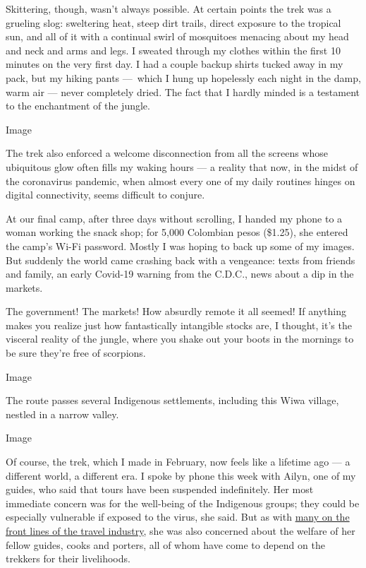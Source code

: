 Skittering, though, wasn't always possible. At certain points the trek
was a grueling slog: sweltering heat, steep dirt trails, direct exposure
to the tropical sun, and all of it with a continual swirl of mosquitoes
menacing about my head and neck and arms and legs. I sweated through my
clothes within the first 10 minutes on the very first day. I had a
couple backup shirts tucked away in my pack, but my hiking pants
---~which I hung up hopelessly each night in the damp, warm air ---
never completely dried. The fact that I hardly minded is a testament to
the enchantment of the jungle.

Image

The trek also enforced a welcome disconnection from all the screens
whose ubiquitous glow often fills my waking hours --- a reality that
now, in the midst of the coronavirus pandemic, when almost every one of
my daily routines hinges on digital connectivity, seems difficult to
conjure.

At our final camp, after three days without scrolling, I handed my phone
to a woman working the snack shop; for 5,000 Colombian pesos (\$1.25),
she entered the camp's Wi-Fi password. Mostly I was hoping to back up
some of my images. But suddenly the world came crashing back with a
vengeance: texts from friends and family, an early Covid-19 warning from
the C.D.C., news about a dip in the markets.

The government! The markets! How absurdly remote it all seemed! If
anything makes you realize just how fantastically intangible stocks are,
I thought, it's the visceral reality of the jungle, where you shake out
your boots in the mornings to be sure they're free of scorpions.

Image

The route passes several Indigenous settlements, including this Wiwa
village, nestled in a narrow valley.

Image

Of course, the trek, which I made in February, now feels like a lifetime
ago --- a different world, a different era. I spoke by phone this week
with Ailyn, one of my guides, who said that tours have been suspended
indefinitely. Her most immediate concern was for the well-being of the
Indigenous groups; they could be especially vulnerable if exposed to the
virus, she said. But as with
\href{https://www.nytimes.com/2020/03/25/travel/coronavirus-travel-hospitality-workers.html}{many
on the front lines of the travel industry}, she was also concerned about
the welfare of her fellow guides, cooks and porters, all of whom have
come to depend on the trekkers for their livelihoods.

